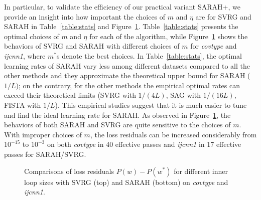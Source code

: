 \documentclass{article}
\newcommand{\new}[1]{\textcolor{red}{#1}}
\begin{document}
In particular, to validate the efficiency of our practical variant SARAH+, we provide an insight into how important the choices of $m$ and $\eta$ are for SVRG and SARAH in Table~\ref{table:stats} and Figure~\ref{fig:ms}. Table~\ref{table:stats} presents the optimal choices of $m$ and $\eta$ for each of the algorithm, while Figure~\ref{fig:ms} shows the behaviors of SVRG and SARAH with different choices of $m$ for \emph{covtype} and \emph{ijcnn1}, where $m^*$s denote the best choices. 
In Table~\ref{table:stats}, the optimal learning rates of SARAH vary less among different datasets compared to all the other methods and they approximate the theoretical  upper bound for SARAH ($1/L$); on the contrary, for the other methods the empirical optimal rates can exceed their theoretical limits (SVRG with $1/(4L)$, SAG with $1/(16L)$, FISTA with $1/L$). This empirical studies suggest that it is much easier to tune and find the ideal learning rate for SARAH. As observed in Figure~\ref{fig:ms}, the behaviors of both SARAH and SVRG are quite sensitive to the choices of $m$. With improper choices of $m$, the loss residuals can be increased considerably from $10^{-15}$ to $10^{-3}$ on both \emph{covtype} in 40 effective passes and \emph{ijcnn1} in 17 effective passes for SARAH/SVRG.

 


 \begin{figure} 
\centering
 \caption{\footnotesize Comparisons of loss residuals $P(w) - P(w^*)$ for different inner loop sizes with SVRG (top) and SARAH (bottom) on \emph{covtype} and \emph{ijcnn1}.}
   \label{fig:ms}
 \end{figure}
\end{document}
